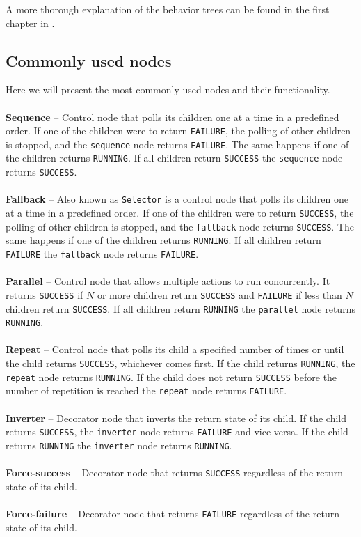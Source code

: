     A more thorough explanation of the behavior trees can be found in the first chapter in \cite{BT_intro}.

    \subsection{Commonly used nodes}
        Here we will present the most commonly used nodes and their functionality.\\\\
        \textbf{Sequence} -- Control node that polls its children one at a time in a predefined order. If one of the children were to return \texttt{FAILURE}, the polling of other children is stopped, and the \texttt{sequence} node returns \texttt{FAILURE}. The same happens if one of the children returns \texttt{RUNNING}. If all children return \texttt{SUCCESS} the \texttt{sequence} node returns \texttt{SUCCESS}.\\\\
        \textbf{Fallback} -- Also known as \texttt{Selector} is a control node that polls its children one at a time in a predefined order. If one of the children were to return \texttt{SUCCESS}, the polling of other children is stopped, and the \texttt{fallback} node returns \texttt{SUCCESS}. The same happens if one of the children returns \texttt{RUNNING}. If all children return \texttt{FAILURE} the \texttt{fallback} node returns \texttt{FAILURE}.\\\\
        \textbf{Parallel} -- Control node that allows multiple actions to run concurrently. It returns \texttt{SUCCESS} if $N$ or more children return \texttt{SUCCESS} and \texttt{FAILURE} if less than $N$ children return \texttt{SUCCESS}. If all children return \texttt{RUNNING} the \texttt{parallel} node returns \texttt{RUNNING}.\\\\
        \textbf{Repeat} -- Control node that polls its child a specified number of times or until the child returns \texttt{SUCCESS}, whichever comes first. If the child returns \texttt{RUNNING}, the \texttt{repeat} node returns \texttt{RUNNING}. If the child does not return \texttt{SUCCESS} before the number of repetition is reached the \texttt{repeat} node returns \texttt{FAILURE}.\\\\
        \textbf{Inverter} -- Decorator node that inverts the return state of its child. If the child returns \texttt{SUCCESS}, the \texttt{inverter} node returns \texttt{FAILURE} and vice versa. If the child returns \texttt{RUNNING} the \texttt{inverter} node returns \texttt{RUNNING}.\\\\
        \textbf{Force-success} -- Decorator node that returns \texttt{SUCCESS} regardless of the return state of its child.\\\\
        \textbf{Force-failure} -- Decorator node that returns \texttt{FAILURE} regardless of the return state of its child.

